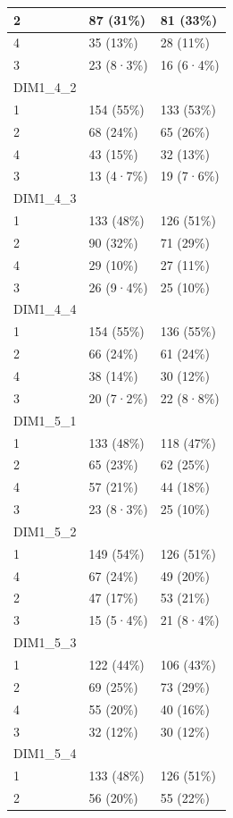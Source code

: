 \documentclass[
]{book}
\begin{document}
\begin{tabular}{l|l|l}
\hline
2 & 87 (31\%) & 81 (33\%)\\
\hline
4 & 35 (13\%) & 28 (11\%)\\
\hline
3 & 23 (8·3\%) & 16 (6·4\%)\\
\hline
DIM1\_4\_2 &  & \\
\hline
1 & 154 (55\%) & 133 (53\%)\\
\hline
2 & 68 (24\%) & 65 (26\%)\\
\hline
4 & 43 (15\%) & 32 (13\%)\\
\hline
3 & 13 (4·7\%) & 19 (7·6\%)\\
\hline
DIM1\_4\_3 &  & \\
\hline
1 & 133 (48\%) & 126 (51\%)\\
\hline
2 & 90 (32\%) & 71 (29\%)\\
\hline
4 & 29 (10\%) & 27 (11\%)\\
\hline
3 & 26 (9·4\%) & 25 (10\%)\\
\hline
DIM1\_4\_4 &  & \\
\hline
1 & 154 (55\%) & 136 (55\%)\\
\hline
2 & 66 (24\%) & 61 (24\%)\\
\hline
4 & 38 (14\%) & 30 (12\%)\\
\hline
3 & 20 (7·2\%) & 22 (8·8\%)\\
\hline
DIM1\_5\_1 &  & \\
\hline
1 & 133 (48\%) & 118 (47\%)\\
\hline
2 & 65 (23\%) & 62 (25\%)\\
\hline
4 & 57 (21\%) & 44 (18\%)\\
\hline
3 & 23 (8·3\%) & 25 (10\%)\\
\hline
DIM1\_5\_2 &  & \\
\hline
1 & 149 (54\%) & 126 (51\%)\\
\hline
4 & 67 (24\%) & 49 (20\%)\\
\hline
2 & 47 (17\%) & 53 (21\%)\\
\hline
3 & 15 (5·4\%) & 21 (8·4\%)\\
\hline
DIM1\_5\_3 &  & \\
\hline
1 & 122 (44\%) & 106 (43\%)\\
\hline
2 & 69 (25\%) & 73 (29\%)\\
\hline
4 & 55 (20\%) & 40 (16\%)\\
\hline
3 & 32 (12\%) & 30 (12\%)\\
\hline
DIM1\_5\_4 &  & \\
\hline
1 & 133 (48\%) & 126 (51\%)\\
\hline
2 & 56 (20\%) & 55 (22\%)\\

\end{tabular}
\end{document}
